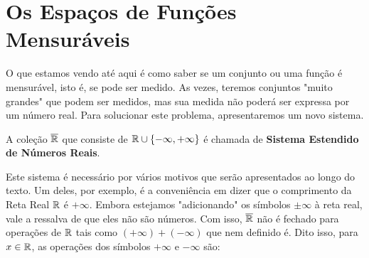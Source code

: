                             
        
    
\section{Os Espaços de Funções Mensuráveis}
    O que estamos vendo até aqui é como saber se um conjunto ou uma função é mensurável, isto é, se pode ser medido.
    As vezes, teremos conjuntos "muito grandes" que podem ser medidos, mas sua medida não poderá ser expressa por um número real.
    Para solucionar este problema, apresentaremos um novo sistema.

    \begin{definition}
    \label{def:reta-estendida}
        A coleção $\operatorname{\overline{\mathbb{R}}}$ que consiste de $\mathbb{R} \cup \{-\infty, +\infty\}$ é chamada de \textbf{Sistema Estendido de Números Reais}.
    \end{definition}

    Este sistema é necessário por vários motivos que serão apresentados ao longo do texto. 
    Um deles, por exemplo, é a conveniência em dizer que o comprimento da Reta Real $\mathbb{R}$ é $+\infty$.
    Embora estejamos "adicionando" os símbolos $\pm \infty$ à reta real, vale a ressalva de que eles não são números.
    Com isso, $\operatorname{\overline{\mathbb{R}}}$ não é fechado para operações de $\mathbb{R}$ tais como $(+\infty) + (-\infty)$ que nem definido é.
    Dito isso, para $x \in \mathbb{R}$, as operações dos símbolos $+\infty$ e $-\infty$ são:


